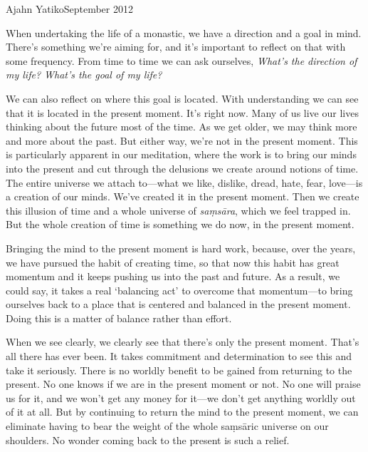{Ajahn Yatiko}{September 2012}

When undertaking the life of a monastic, we have a direction and a goal 
in mind. There's something we're aiming for, and it's important to 
reflect on that with some frequency. From time to time we can ask 
ourselves, \emph{What's the direction of my life? What's the goal of my 
life?}

We can also reflect on where this goal is located. With understanding 
we can see that it is located in the present moment. It's right now. 
Many of us live our lives thinking about the future most of the time. 
As we get older, we may think more and more about the past. But either 
way, we're not in the present moment. This is particularly apparent in 
our meditation, where the work is to bring our minds into the present 
and cut through the delusions we create around notions of time. The 
entire universe we attach to---what we like, dislike, dread, hate, 
fear, love---is a creation of our minds. We've created it in the 
present moment. Then we create this illusion of time and a whole 
universe of \emph{saṃsāra}, which we feel trapped in. But the whole 
creation of time is something we do now, in the present moment.

Bringing the mind to the present moment is hard work, because, over the 
years, we have pursued the habit of creating time, so that now this 
habit has great momentum and it keeps pushing us into the past and 
future. As a result, we could say, it takes a real `balancing act' to 
overcome that momentum---to bring ourselves back to a place that is 
centered and balanced in the present moment. Doing this is a matter of 
balance rather than effort.

When we see clearly, we clearly see that there's only the present 
moment. That's all there has ever been. It takes commitment and 
determination to see this and take it seriously. There is no worldly 
benefit to be gained from returning to the present. No one knows if we 
are in the present moment or not. No one will praise us for it, and we 
won't get any money for it---we don't get anything worldly out of it at 
all. But by continuing to return the mind to the present moment, we can 
eliminate having to bear the weight of the whole saṃsāric universe 
on our shoulders. No wonder coming back to the present is such a relief.

